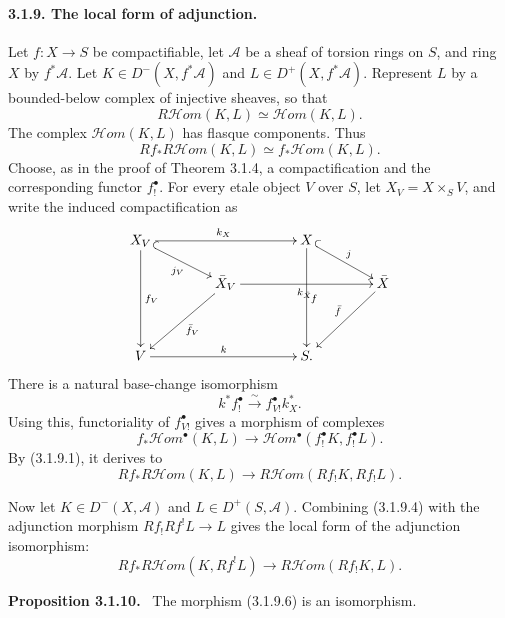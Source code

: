 \documentclass[12pt]{article}
\newcommand{\Aa}{\mathcal A}
\newcommand{\Hhom}{\mathcal{H}om}
\newenvironment{statement}[1]{\par\medskip\noindent\textbf{#1.}\ }{\par\medskip}
\begin{document}
\paragraph{3.1.9. The local form of adjunction.}
Let $f:X\to S$ be compactifiable, let $\Aa$ be a sheaf of torsion rings on $S$, and ring $X$ by $f^*\Aa$. Let $K\in D^-(X,f^*\Aa)$ and $L\in D^+(X,f^*\Aa)$. Represent $L$ by a bounded-below complex of injective sheaves, so that
\[
   R\Hhom(K,L)\simeq \Hhom(K,L).
\]
The complex $\Hhom(K,L)$ has flasque components. Thus
\begin{equation}
   Rf_*R\Hhom(K,L)\simeq f_*\Hhom(K,L). \tag{3.1.9.1}
\end{equation}
Choose, as in the proof of Theorem 3.1.4, a compactification and the corresponding functor $f_!^{\bullet}$. For every etale object $V$ over $S$, let $X_V=X\times_SV$, and write the induced compactification as
\[
\xymatrix@C=1.4cm@R=.55cm{
X_V\ar[rr]^{k_X}\ar@{^{(}->}[rd]_{j_V}\ar[ddd]^{f_V} && X\ar[ddd]^f\ar@{^{(}->}[rd]^j\\
&\bar X_V\ar[ldd]^{\bar f_V}\ar[rr]_{k_{\bar X}} && \bar X\ar[ldd]_{\bar f}\\
&&&\\
V\ar[rr]^k && S .
}
\]
There is a natural base-change isomorphism
\begin{equation}
   k^*f_!^{\bullet}\xrightarrow{\sim} f^{\bullet}_{V!}k_X^*. \tag{3.1.9.3}
\end{equation}
Using this, functoriality of $f^{\bullet}_{V!}$ gives a morphism of complexes
\begin{equation}
   f_*\Hhom^{\bullet}(K,L)\longrightarrow
   \Hhom^{\bullet}(f_!^{\bullet}K,f_!^{\bullet}L). \tag{3.1.9.4}
\end{equation}
By (3.1.9.1), it derives to
\begin{equation}
   Rf_*R\Hhom(K,L)\longrightarrow
   R\Hhom(Rf_!K,Rf_!L). \tag{3.1.9.5}
\end{equation}

Now let $K\in D^-(X,\Aa)$ and $L\in D^+(S,\Aa)$. Combining (3.1.9.4) with the adjunction morphism $Rf_!Rf^!L\to L$ gives the local form of the adjunction isomorphism:
\begin{equation}
   Rf_*R\Hhom(K,Rf^!L)\longrightarrow
   R\Hhom(Rf_!K,L). \tag{3.1.9.6}
\end{equation}

\begin{statement}{Proposition 3.1.10}
The morphism (3.1.9.6) is an isomorphism.
\end{statement}
\end{document}
